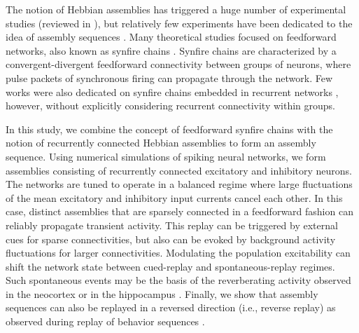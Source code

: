   The notion of Hebbian assemblies has triggered a huge number of experimental
  studies (reviewed in \citep{Wallace2010}), but relatively few experiments have
  been dedicated to the idea of assembly sequences \citep{Kruskal2013,
  Almeida2014}. Many theoretical studies focused on feedforward networks,
  also known as synfire chains \citep{Abeles1991, Diesmann1999, Aviel2002,
  Jahnke2013}. Synfire chains are characterized by a convergent-divergent
  feedforward connectivity between groups of neurons, where pulse packets of
  synchronous firing can propagate through the network. Few works were also
  dedicated on synfire chains embedded in recurrent networks \citep{Aviel2003,
  Kumar2008, Trengove2013}, however, without explicitly considering recurrent
  connectivity within groups.

  In this study, we combine the concept of feedforward synfire chains with the
  notion of recurrently connected Hebbian assemblies to form an assembly
  sequence. Using numerical simulations of spiking neural networks, we form
  assemblies consisting of recurrently connected excitatory and inhibitory
  neurons. The networks are tuned to operate in a balanced regime where large
  fluctuations of the mean excitatory and inhibitory input currents cancel each
  other. In this case, distinct assemblies that are sparsely connected in a
  feedforward fashion can reliably propagate transient activity. This replay
  can be triggered by external cues for sparse connectivities, but also can be
  evoked by background activity fluctuations for larger connectivities.
  Modulating the population excitability can shift the network state between
  cued-replay and spontaneous-replay regimes.
  Such spontaneous events may be the basis of the reverberating activity
  observed in the neocortex \citep{Kenet2003, Luczak2009, Contreras2013} or in
  the hippocampus \citep{Lee2002, Dragoi2013, Stark2015}. Finally, we show
  that assembly sequences can also be replayed in a reversed direction (i.e.,
  reverse replay) as observed during replay of behavior sequences
  \citep{Foster2006, Diba2007}. 


